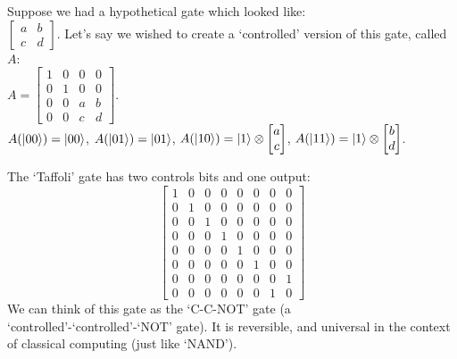 \begin{example}
    Suppose we had a hypothetical gate which looked like:\\
    $\begin{bmatrix}
        a & b\\
        c & d
    \end{bmatrix}$. Let's say we wished to create a `controlled' version of this gate, called $A$:\\
    $A = \begin{bmatrix}
        1 & 0 & 0 & 0\\
        0 & 1 & 0 & 0\\
        0 & 0 & a & b\\
        0 & 0 & c & d
    \end{bmatrix}$.\\
    $A(\lvert00\rangle) = \lvert00\rangle$, $A(\lvert01\rangle) = \lvert01\rangle$, $A(\lvert10\rangle) = \lvert1\rangle \otimes \begin{bmatrix}
        a\\
        c
    \end{bmatrix}$, $A(\lvert11\rangle) = \lvert1\rangle \otimes \begin{bmatrix}
        b\\
        d
    \end{bmatrix}$.\\
\end{example}

The `Taffoli' gate has two controls bits and one output:
\[ \begin{bmatrix}
    1 & 0 & 0 & 0 & 0 & 0 & 0 & 0\\
    0 & 1 & 0 & 0 & 0 & 0 & 0 & 0\\
    0 & 0 & 1 & 0 & 0 & 0 & 0 & 0\\
    0 & 0 & 0 & 1 & 0 & 0 & 0 & 0\\
    0 & 0 & 0 & 0 & 1 & 0 & 0 & 0\\
    0 & 0 & 0 & 0 & 0 & 1 & 0 & 0\\
    0 & 0 & 0 & 0 & 0 & 0 & 0 & 1\\
    0 & 0 & 0 & 0 & 0 & 0 & 1 & 0
\end{bmatrix} \]
We can think of this gate as the `C-C-NOT' gate (a `controlled'-`controlled'-`NOT' gate). It is reversible, and universal in the context of classical computing (just like `NAND').\\

\pagebreak

